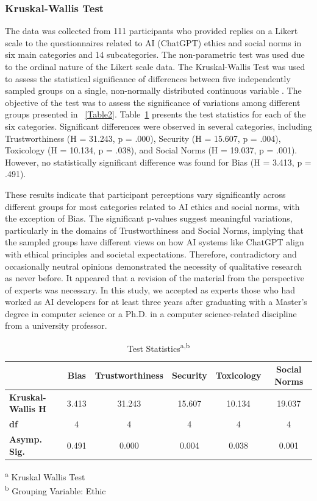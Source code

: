 \documentclass[sigconf]{acmart}
\begin{document}
\subsubsection{Kruskal-Wallis Test}
\hfill \break


The data was collected from 111 participants who provided replies on a Likert scale to the questionnaires related to AI (ChatGPT) ethics and social norms in six main categories and 14 subcategories. The non-parametric test was used due to the ordinal nature of the Likert scale data. The Kruskal-Wallis Test was used to assess the statistical significance of differences between five independently sampled groups on a single, non-normally distributed continuous variable \cite{mckight2010kruskal}. The objective of the test was to assess the significance of variations among different groups presented in ~\autoref{Table2}. Table~\ref{Table3} presents the test statistics for each of the six categories. Significant differences were observed in several categories, including Trustworthiness (H = 31.243, p = .000), Security (H = 15.607, p = .004), Toxicology (H = 10.134, p = .038), and Social Norms (H = 19.037, p = .001). However, no statistically significant difference was found for Bias (H = 3.413, p = .491).

These results indicate that participant perceptions vary significantly across different groups for most categories related to AI ethics and social norms, with the exception of Bias. The significant p-values suggest meaningful variations, particularly in the domains of Trustworthiness and Social Norms, implying that the sampled groups have different views on how AI systems like ChatGPT align with ethical principles and societal expectations. Therefore, contradictory and occasionally neutral opinions demonstrated the necessity of qualitative research as never before. It appeared that a revision of the material from the perspective of experts was necessary. In this study, we accepted as experts those who had worked as AI developers for at least three years after graduating with a Master's degree in computer science or a Ph.D. in a computer science-related discipline from a university professor.




\begin{table}[h]
\centering
\caption{Test Statistics\textsuperscript{a,b}}
\label{Table3}
\begin{tabular}{lccccc}
\toprule
 & Bias & Trustworthiness & Security & Toxicology & Social Norms \\
\midrule
\textbf{Kruskal-Wallis H} & 3.413 & 31.243 & 15.607 & 10.134 & 19.037 \\
\textbf{df} & 4 & 4 & 4 & 4 & 4 \\
\textbf{Asymp. Sig.} & 0.491 & 0.000 & 0.004 & 0.038 & 0.001 \\
\bottomrule
\end{tabular}
\begin{flushleft}
\textsuperscript{a} Kruskal Wallis Test \\
\textsuperscript{b} Grouping Variable: Ethic
\end{flushleft}
\end{table}
\end{document}
